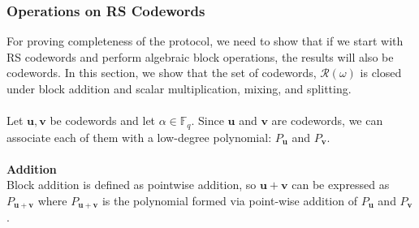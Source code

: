 \documentclass[10pt,letterpaper,titlepage]{article}
\newcommand{\GF}[1]{\mathbb{F}_{#1}}
\newcommand{\w}[0]{\omega}
\theoremstyle{definition}
\begin{document}
\begin{appendices}
\subsubsection{Operations on RS Codewords}
\label{RS operations}
For proving completeness of the protocol, we need to show that if we start with RS codewords and perform algebraic block operations, the results will also be codewords. 
In this section, we show that the set of codewords, $\mathcal{R}(\w)$ is closed under block addition and scalar multiplication, mixing, and splitting. \\
\\
Let $\mathbf{u},\mathbf{v}$ be codewords and let $\alpha\in\GF{q}$. 
Since $\mathbf{u}$ and $\mathbf{v}$ are codewords, we can associate each of them with a low-degree polynomial: $P_\mathbf{u}$ and $P_\mathbf{v}$.\\
\\
\textbf{Addition}\\
Block addition is defined as pointwise addition, so $\mathbf{u}+\mathbf{v}$ can be expressed as $P_{\mathbf{u}+\mathbf{v}}$ where $P_{\mathbf{u}+\mathbf{v}}$ is the polynomial formed via point-wise addition of $P_\mathbf{u}$ and $P_\mathbf{v}$. 


\end{appendices}
\end{document}
